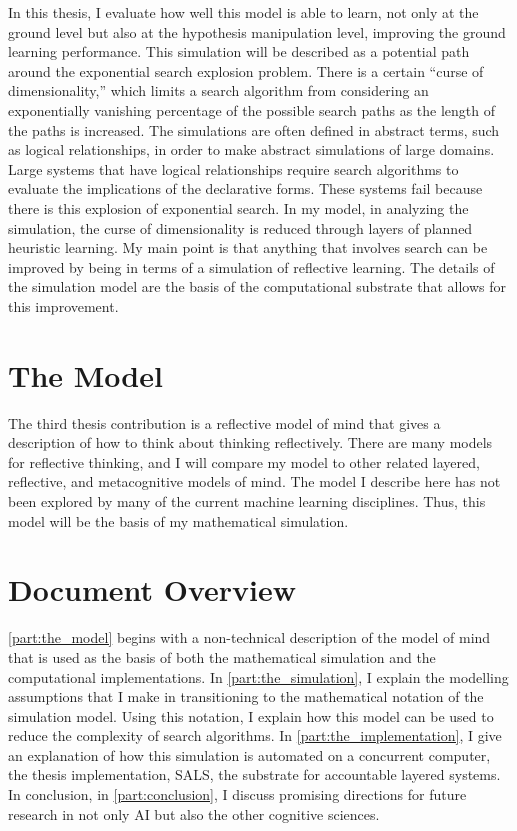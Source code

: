 In this thesis, I evaluate how well this model is able to learn, not
only at the ground level but also at the hypothesis manipulation
level, improving the ground learning performance.  This simulation
will be described as a potential path around the exponential search
explosion problem.  There is a certain ``curse of dimensionality,''
which limits a search algorithm from considering an exponentially
vanishing percentage of the possible search paths as the length of the
paths is increased.  The simulations are often defined in abstract
terms, such as logical relationships, in order to make abstract
simulations of large domains.  Large systems that have logical
relationships require search algorithms to evaluate the implications
of the declarative forms.  These systems fail because there is this
explosion of exponential search.  In my model, in analyzing the
simulation, the curse of dimensionality is reduced through layers of
planned heuristic learning.  My main point is that anything that
involves search can be improved by being in terms of a simulation of
reflective learning.  The details of the simulation model are the
basis of the computational substrate that allows for this improvement.

\section{The Model}

The third thesis contribution is a reflective model of mind that gives
a description of how to think about thinking reflectively.  There are
many models for reflective thinking, and I will compare my model to
other related layered, reflective, and metacognitive models of mind.
The model I describe here has not been explored by many of the current
machine learning disciplines.  Thus, this model will be the basis of
my mathematical simulation.

\section{Document Overview}

{\mbox{\autoref{part:the_model}}} begins with a non-technical
description of the model of mind that is used as the basis of both the
mathematical simulation and the computational implementations.  In
{\mbox{\autoref{part:the_simulation}}}, I explain the modelling
assumptions that I make in transitioning to the mathematical notation
of the simulation model.  Using this notation, I explain how this
model can be used to reduce the complexity of search algorithms.  In
{\mbox{\autoref{part:the_implementation}}}, I give an explanation of
how this simulation is automated on a concurrent computer, the thesis
implementation, SALS, the substrate for accountable layered systems.
In conclusion, in {\mbox{\autoref{part:conclusion}}}, I discuss
promising directions for future research in not only AI but also the
other cognitive sciences.

